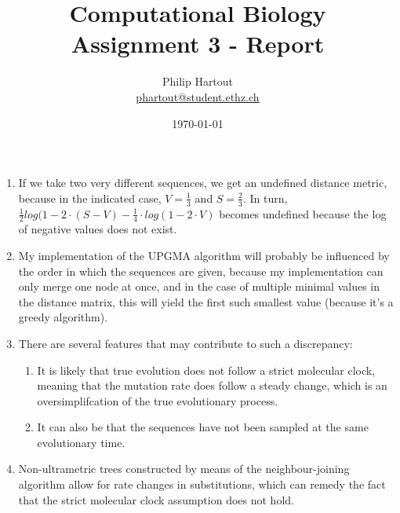 \documentclass[a4paper,10pt,twoside]{article}
\title{Computational Biology \\ Assignment 3 - Report}
\author{Philip Hartout \\ \url{phartout@student.ethz.ch}}
\date{\today}
\begin{document}
\maketitle

\begin{enumerate}
    \item If we take two very different sequences, we get an undefined distance metric, because in the indicated case, $V=\frac{1}{3}$ and $S=\frac{2}{3}$. In turn, $\frac{1}{2}log(1-2\cdot (S-V)-\frac{1}{4}\cdot log(1-2\cdot V)$ becomes undefined because the log of negative values does not exist.
    \item My implementation of the UPGMA algorithm will probably be influenced by the order in which the sequences are given, because my implementation can only merge one node at once, and in the case of multiple minimal values in the distance matrix, this will yield the first such smallest value (because it's a greedy algorithm). 
    \item There are several features that may contribute to such a discrepancy:
    \begin{enumerate}
        \item It is likely that true evolution does not follow a strict molecular clock, meaning that the mutation rate does follow a steady change, which is an oversimplifcation of the true evolutionary process.
        \item It can also be that the sequences have not been sampled at the same evolutionary time.
    \end{enumerate}
    \item Non-ultrametric trees constructed by means of the neighbour-joining algorithm allow for rate changes in substitutions, which can remedy the fact that the strict molecular clock assumption does not hold.  
\end{enumerate}
\end{document}
